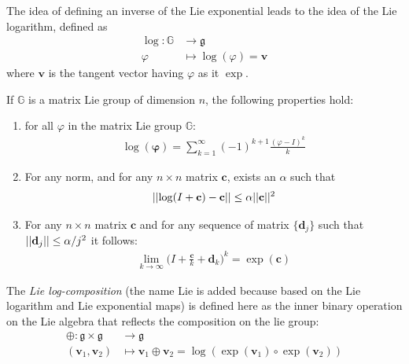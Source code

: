 The idea of defining an inverse of the Lie exponential leads to the idea of the Lie logarithm, defined as
\begin{align*}
\log : \mathbb{G} & \longrightarrow \mathfrak{g} \\
\varphi &\longmapsto \log (\varphi)  =  \mathbf{v}   
\end{align*}
where $\mathbf{v}$ is the tangent vector having $\varphi$ as it $\exp$.

\noindent
If $\mathbb{G}$ is a matrix Lie group of dimension $n$, the following properties hold:
\begin{enumerate}
	\item for all $\varphi$ in the matrix Lie group $\mathbb{G}$:
	\begin{align}\label{eq:log_as_inf_sum}
	\log(\mathbf{\varphi}) = \sum_{k=1}^{\infty}(-1)^{k+1} \frac{(\varphi-I)^{k} }{k}
	\end{align}
	\item For any norm, and for any $n\times n$ matrix $\mathbf{c}$, exists an $\alpha$ such that 
	\begin{align}\label{eq:prop_matrix_diff_log}
	\vert\lvert  \log(I + \mathbf{c}) - \mathbf{c}  \rvert\vert  \leq \alpha \vert\lvert  \mathbf{c} \rvert\vert^{2}
	\end{align}
	\item For any $n\times n$ matrix $\mathbf{c}$ and for any sequence of matrix $\{\mathbf{d}_{j}\}$ such that  $\vert\lvert  \mathbf{d}_{j} \rvert\vert \leq \alpha/j^2$ it follows:
	\begin{align}\label{eq:prop_matrix_lim}
	\lim_{k\rightarrow \infty} \big( I + \frac{\mathbf{c}}{k} + \mathbf{d}_{k} \big)^{k} = \exp{(\mathbf{c})}
	\end{align}
\end{enumerate} 

The \emph{Lie log-composition} (the name Lie is added because based on the Lie logarithm and Lie exponential maps) is defined here as the inner binary operation on the Lie algebra that reflects the composition on the lie group:
\begin{align*}
\oplus : \mathfrak{g} \times \mathfrak{g} & \longrightarrow \mathfrak{g}    \\
(\mathbf{v}_{1}, \mathbf{v}_{2}) &\longmapsto \mathbf{v}_{1}\oplus \mathbf{v}_{2} =  \log(\exp(\mathbf{v}_1)\circ \exp(\mathbf{v}_2))
\end{align*}

